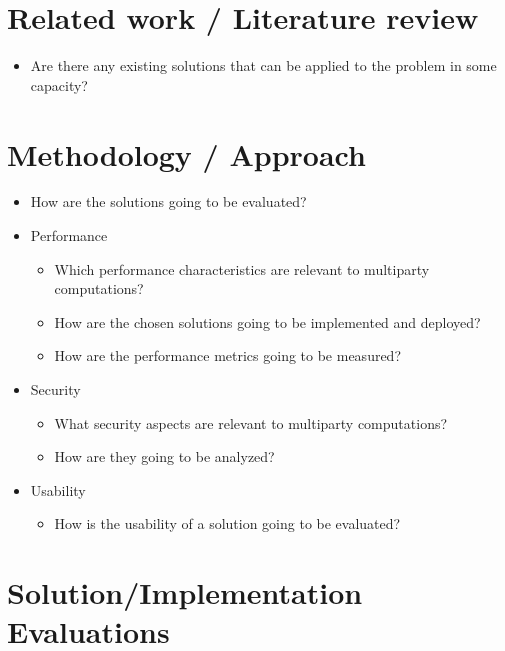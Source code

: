 \section{Related work / Literature review}\label{notes__06000-thesis.md__related-work-literature-review}

\begin{itemize}
\tightlist
\item
  Are there any existing solutions that can be applied to the problem in some capacity?
\end{itemize}

\section{Methodology / Approach}\label{notes__06000-thesis.md__methodology-approach}

\begin{itemize}
\tightlist
\item
  How are the solutions going to be evaluated?
\item
  Performance

  \begin{itemize}
  \tightlist
  \item
    Which performance characteristics are relevant to multiparty computations?
  \item
    How are the chosen solutions going to be implemented and deployed?
  \item
    How are the performance metrics going to be measured?
  \end{itemize}
\item
  Security

  \begin{itemize}
  \tightlist
  \item
    What security aspects are relevant to multiparty computations?
  \item
    How are they going to be analyzed?
  \end{itemize}
\item
  Usability

  \begin{itemize}
  \tightlist
  \item
    How is the usability of a solution going to be evaluated?
  \end{itemize}
\end{itemize}

\section{Solution/Implementation Evaluations}\label{notes__06000-thesis.md__solutionimplementation-evaluations}

